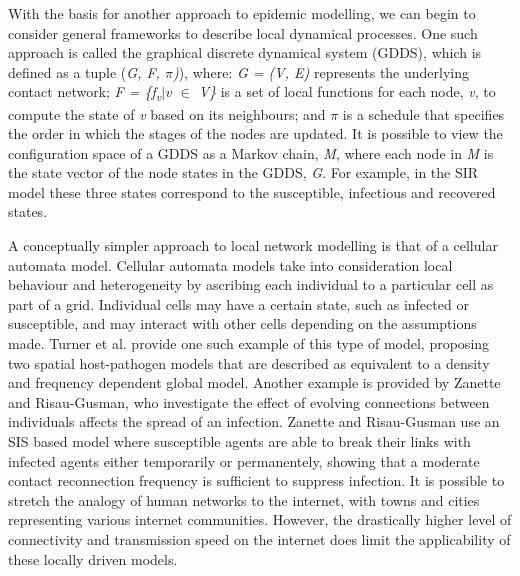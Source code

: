 \documentclass[11pt, a4paper, oneside,titlepage]{article}
\begin{document}
With the basis for another approach to epidemic modelling, we can
begin to consider general frameworks to describe local dynamical
processes. One such approach is called the graphical discrete
dynamical system (GDDS)\cite{bisset}, which is defined as a tuple
(\emph{G, F, $\pi$)}), where: \emph{G = (V, E)} represents the
underlying contact network;  \emph{F = \{f\textsubscript{v}$|$v $\in$
  V\}} is a set of local functions for each node, \emph{v}, to compute
the state of \emph{v} based on its neighbours; and $\pi$ is a schedule
that specifies the order in which the stages of the nodes are
updated. It is possible to view the configuration space of a GDDS as a
Markov chain, \emph{M}, where each node in \emph{M} is the state
vector of the node states in the GDDS, \emph{G}. For example, in the
SIR model these three states correspond to the susceptible, infectious
and recovered states. 

A conceptually simpler approach to local network modelling is that of
a cellular automata model. Cellular automata models take into
consideration local behaviour and heterogeneity by ascribing each
individual to a particular cell as part of a grid. Individual cells
may have a certain state, such as infected or susceptible, and may
interact with other cells depending on the assumptions made. Turner et
al. provide one such example of this type of model, proposing two
spatial host-pathogen models that are described as equivalent to a
density and frequency dependent global model.\cite{turner} Another
example is provided by Zanette and Risau-Gusman, who investigate the
effect of evolving connections between individuals affects the spread
of an infection. Zanette and Risau-Gusman use an SIS based model where
susceptible agents are able to break their links with infected agents
either temporarily or permanentely, showing that a moderate contact
reconnection frequency is sufficient to suppress
infection.\cite{zanette}  It is possible to stretch the analogy of
human networks to the internet, with towns and cities representing
various internet communities. However, the drastically higher level of
connectivity and transmission speed on the internet does limit the
applicability of these locally driven models.
\end{document}
